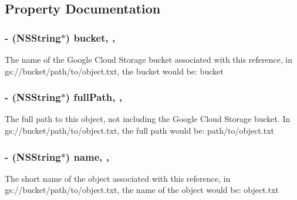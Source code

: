 \subsection{Property Documentation}
\hypertarget{interface_f_i_r_storage_reference_a685333b75b9c800611cea278dcfe06b5}{}
\subsubsection[{bucket}]{\setlength{\rightskip}{0pt plus 5cm}-\/ (N\+S\+String$\ast$) bucket\hspace{0.3cm}{\ttfamily [read]}, {\ttfamily [nonatomic]}, {\ttfamily [assign]}}\label{interface_f_i_r_storage_reference_a685333b75b9c800611cea278dcfe06b5}
The name of the Google Cloud Storage bucket associated with this reference, in gs\+://bucket/path/to/object.txt, the bucket would be\+: \textquotesingle{}bucket\textquotesingle{} \hypertarget{interface_f_i_r_storage_reference_a8af04c7ca02e65c37f50713efe697e49}{}
\subsubsection[{full\+Path}]{\setlength{\rightskip}{0pt plus 5cm}-\/ (N\+S\+String$\ast$) full\+Path\hspace{0.3cm}{\ttfamily [read]}, {\ttfamily [nonatomic]}, {\ttfamily [assign]}}\label{interface_f_i_r_storage_reference_a8af04c7ca02e65c37f50713efe697e49}
The full path to this object, not including the Google Cloud Storage bucket. In gs\+://bucket/path/to/object.txt, the full path would be\+: \textquotesingle{}path/to/object.\+txt\textquotesingle{} \hypertarget{interface_f_i_r_storage_reference_a46b7942007399f60156d1ba6cfd0b089}{}
\subsubsection[{name}]{\setlength{\rightskip}{0pt plus 5cm}-\/ (N\+S\+String$\ast$) name\hspace{0.3cm}{\ttfamily [read]}, {\ttfamily [nonatomic]}, {\ttfamily [assign]}}\label{interface_f_i_r_storage_reference_a46b7942007399f60156d1ba6cfd0b089}
The short name of the object associated with this reference, in gs\+://bucket/path/to/object.txt, the name of the object would be\+: \textquotesingle{}object.\+txt\textquotesingle{} \hypertarget{interface_f_i_r_storage_reference_a7441bb92a62af97dfdecbefbe9999180}{}
